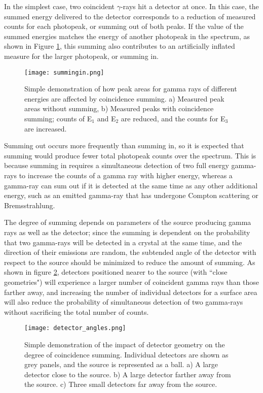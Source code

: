 \documentclass[12pt,twoside]{reedthesis}
\begin{document}
In the simplest case, two coincident $\gamma$-rays hit a detector at once. In this case, the summed energy delivered to the detector corresponds to a reduction of measured counts for each photopeak, or summing out of both peaks. If the value of the summed energies matches the energy of another photopeak in the spectrum, as shown in Figure \ref{sum_in}, this summing also contributes to an artificially inflated measure for the larger photopeak, or summing in.

 \begin{figure}[h!]
	\centering
	\texttt{[image: summingin.png]}
	\caption{Simple demonstration of how peak areas for gamma rays of different energies are affected by coincidence summing. a) Measured peak areas without summing, b) Measured peaks with coincidence summing; counts of E$_{1}$ and E$_{2}$ are reduced, and the counts for E$_{3}$ are increased.}
\label{sum_in}
\end{figure}

Summing out occurs more frequently than summing in, so it is expected that summing would produce fewer total photopeak counts over the spectrum. This is because summing in requires a simultaneous detection of two full energy gamma-rays to increase the counts of a gamma ray with higher energy, whereas a gamma-ray can sum out if it is detected at the same time as any other additional energy, such as an emitted gamma-ray that has undergone Compton scattering or Bremsstrahlung.

The degree of summing depends on parameters of the source producing gamma rays as well as the detector; since the summing is dependent on the probability that two gamma-rays will be detected in a crystal at the same time, and the direction of their emissions are random, the subtended angle of the detector with respect to the source should be minimized to reduce the amount of summing. As shown in figure \ref{angle}, detectors positioned nearer to the source (with ``close geometries") will experience a larger number of coincident gamma rays than those farther away, and increasing the number of individual detectors for a surface area will also reduce the probability of simultaneous detection of two gamma-rays without sacrificing the total number of counts.

 \begin{figure}[h!]
	\centering
	\texttt{[image: detector\_angles.png]}
	\caption{Simple demonstration of the impact of detector geometry on the degree of coincidence summing. Individual detectors are shown as grey panels, and the source is represented as a ball. a) A large detector close to the source. b) A large detector farther away from the source. c) Three small detectors far away from the source.}
\label{angle}
\end{figure}
\end{document}
